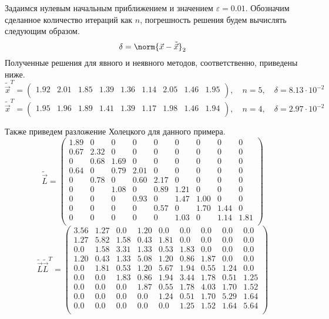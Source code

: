 \begin{landscape}
Задаимся нулевым начальным приближением и значением $\varepsilon = 0.01$. Обозначим сделанное количество итераций как $n$,
погрешность решения будем вычислять следующим образом.
\[
    \delta = \norm{\vec{x} - \tilde{\vec{x}}}_2
\]
Полученные решения для явного и неявного методов, соответственно, приведены ниже.
\[
    \tilde{\vec{x}}^T = \begin{pmatrix}
        1.92 & 2.01 & 1.85 & 1.39 & 1.36 & 1.14 & 2.05 & 1.46 & 1.95 \\
    \end{pmatrix},\quad n = 5,\quad \delta = 8.13 \cdot 10^{-2}
\]
\[
    \tilde{\vec{x}}^T = \begin{pmatrix}
        1.95 & 1.96 & 1.89 & 1.41 & 1.39 & 1.17 & 1.98 & 1.46 & 1.94 \\
    \end{pmatrix},\quad n = 4,\quad \delta = 2.97 \cdot 10^{-2}
\]
\end{landscape}

\newpage
\begin{landscape}
Также приведем разложение Холецкого для данного примера.
\[
    \widetilde{\vec{L}} =
    \begin{pmatrix}
        1.89 & 0 & 0 & 0 & 0 & 0 & 0 & 0 & 0 \\
        0.67 & 2.32 & 0 & 0 & 0 & 0 & 0 & 0 & 0 \\
        0 & 0.68 & 1.69 & 0 & 0 & 0 & 0 & 0 & 0 \\
        0.64 & 0 & 0.79 & 2.01 & 0 & 0 & 0 & 0 & 0 \\
        0 & 0.78 & 0 & 0.60 & 2.17 & 0 & 0 & 0 & 0 \\
        0 & 0 & 1.08 & 0 & 0.89 & 1.21 & 0 & 0 & 0 \\
        0 & 0 & 0 & 0.93 & 0 & 1.47 & 1.00 & 0 & 0 \\
        0 & 0 & 0 & 0 & 0.57 & 0 & 1.70 & 1.44 & 0 \\
        0 & 0 & 0 & 0 & 0 & 1.03 & 0 & 1.14 & 1.81 \\
    \end{pmatrix}
\]
\[
    \widetilde{\vec{L}} \widetilde{\vec{L}}^T =
    \begin{pmatrix}
        3.56 & 1.27 & 0.0 & 1.20 & 0.0 & 0.0 & 0.0 & 0.0 & 0.0 \\
        1.27 & 5.82 & 1.58 & 0.43 & 1.81 & 0.0 & 0.0 & 0.0 & 0.0 \\
        0.0 & 1.58 & 3.31 & 1.33 & 0.53 & 1.83 & 0.0 & 0.0 & 0.0 \\
        1.20 & 0.43 & 1.33 & 5.08 & 1.20 & 0.86 & 1.87 & 0.0 & 0.0 \\
        0.0 & 1.81 & 0.53 & 1.20 & 5.67 & 1.94 & 0.55 & 1.24 & 0.0 \\
        0.0 & 0.0 & 1.83 & 0.86 & 1.94 & 3.44 & 1.78 & 0.51 & 1.25 \\
        0.0 & 0.0 & 0.0 & 1.87 & 0.55 & 1.78 & 4.03 & 1.70 & 1.52 \\
        0.0 & 0.0 & 0.0 & 0.0 & 1.24 & 0.51 & 1.70 & 5.29 & 1.64 \\
        0.0 & 0.0 & 0.0 & 0.0 & 0.0 & 1.25 & 1.52 & 1.64 & 5.64 \\
    \end{pmatrix}
\]
\end{landscape}

